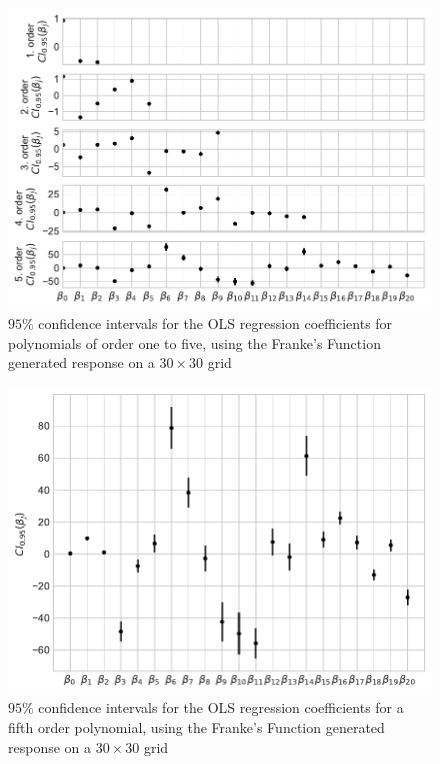 \documentclass[%
oneside,                 %
final,                   %
10pt]{article}
\begin{document}
\begin{figure}[!h]
        \centering 
         \includegraphics[scale=0.7]{../Results/Part_a/betas_franke_all_noise03.pdf} 
        \caption{$95\%$ confidence intervals for the OLS regression coefficients for polynomials of order one to five, using the Franke's Function generated response on a $30\times 30$ grid}
        \label{fig:betas_all}   
\end{figure}  

\begin{figure}[!h]
        \centering 
         \includegraphics[scale=0.7]{../Results/Part_a/Part_abetas_franke_p5_noise03.pdf} 
        \caption{$95\%$ confidence intervals for the OLS regression coefficients for a fifth order polynomial, using the Franke's Function generated response on a $30\times 30$ grid}
        \label{fig:betas_fifth}   
\end{figure}  
\end{document}
